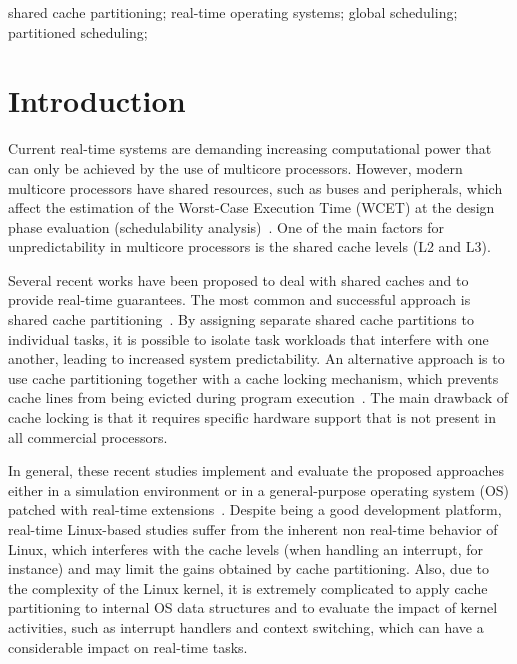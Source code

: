 \documentclass[10pt, conference, compsocconf]{IEEEtran}
\begin{document}
\begin{IEEEkeywords}
shared cache partitioning; real-time operating systems; global scheduling; partitioned scheduling; 
\end{IEEEkeywords}


%
\IEEEpeerreviewmaketitle

\section{Introduction}

Current real-time systems are demanding increasing computational power that can only be achieved by the use of multicore processors. However, modern multicore processors have shared resources, such as buses and peripherals, which affect the estimation of the Worst-Case Execution Time (WCET) at the design phase evaluation (schedulability analysis)~\cite{Mancuso:2013}. One of the main factors for unpredictability in multicore processors is the shared cache levels (L2 and L3).

Several recent works have been proposed to deal with shared caches and to provide real-time guarantees. The most common and successful approach is shared cache partitioning~\cite{Liedtke:1997,Kenna:2013}. By assigning separate shared cache partitions to individual tasks, it is possible to isolate task workloads that interfere with one another, leading to increased system predictability. An alternative approach is to use cache partitioning together with a cache locking mechanism, which prevents cache lines from being evicted during program execution~\cite{Suhendra:2008,Sarkar:2012,Mancuso:2013}. The main drawback of cache locking is that it requires specific hardware support that is not present in all commercial processors. 

In general, these recent studies implement and evaluate the proposed approaches either in a simulation environment or in a general-purpose operating system (OS) patched with real-time extensions~\cite{Sarkar:2012,Mancuso:2013,Kenna:2013}. Despite being a good development platform, real-time Linux-based studies suffer from the inherent non real-time behavior of Linux, which interferes with the cache levels (when handling an interrupt, for instance) and may limit the gains obtained by cache partitioning. Also, due to the complexity of the Linux kernel, it is extremely complicated to apply cache partitioning to internal OS data structures and to evaluate the impact of kernel activities, such as interrupt handlers and context switching, which can have a considerable impact on real-time tasks.
\end{document}
